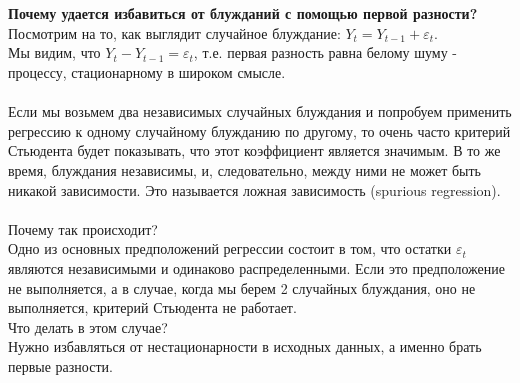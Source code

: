 \documentclass{article}
\begin{document}
\begin{itemize}
    \\
    \\ \textbf{Почему удается избавиться от блужданий с помощью первой разности?}
    \\Посмотрим на то, как выглядит случайное блуждание: $Y_t = Y_{t-1} + \varepsilon_t$. 
    \\ Мы видим, что $Y_t - Y_{t-1} = \varepsilon_t$, т.е. первая разность равна белому шуму - процессу, стационарному в широком смысле.
    \\
    \\ Если мы возьмем два независимых случайных блуждания и попробуем применить регрессию к одному случайному блужданию по другому, то очень часто критерий Стьюдента будет показывать, что этот коэффициент является значимым. В то же время, блуждания независимы, и, следовательно, между ними не может быть никакой зависимости. Это называется ложная зависимость (spurious regression).
    \\
    \\ Почему так происходит?
    \\ Одно из основных предположений регрессии состоит в том, что остатки $\varepsilon_t$ являются независимыми и одинаково распределенными. Если это предположение не выполняется, а в случае, когда мы берем 2 случайных блуждания, оно не выполняется, критерий Стьюдента не работает. 
    \\ Что делать в этом случае?
    \\ Нужно избавляться от нестационарности в исходных данных, а именно брать первые разности. 


\end{itemize}
\end{document}
